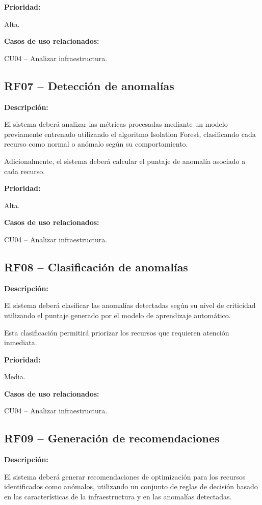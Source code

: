 \noindent \textbf{Prioridad:}

Alta.

\noindent \textbf{Casos de uso relacionados:}

\noindent CU04 -- Analizar infraestructura.

\subsection{RF07 -- Detección de anomalías}

\noindent \textbf{Descripción:}

El sistema deberá analizar las métricas procesadas mediante un modelo previamente entrenado utilizando el algoritmo Isolation Forest, clasificando cada recurso como normal o anómalo según su comportamiento.

Adicionalmente, el sistema deberá calcular el puntaje de anomalía asociado a cada recurso.

\noindent \textbf{Prioridad:}

Alta.

\noindent \textbf{Casos de uso relacionados:}

\noindent CU04 -- Analizar infraestructura.

\subsection{RF08 -- Clasificación de anomalías}

\noindent \textbf{Descripción:}

El sistema deberá clasificar las anomalías detectadas según su nivel de criticidad utilizando el puntaje generado por el modelo de aprendizaje automático.

Esta clasificación permitirá priorizar los recursos que requieren atención inmediata.

\noindent \textbf{Prioridad:}

Media.

\noindent \textbf{Casos de uso relacionados:}

\noindent CU04 -- Analizar infraestructura.

\subsection{RF09 -- Generación de recomendaciones}

\noindent \textbf{Descripción:}

El sistema deberá generar recomendaciones de optimización para los recursos identificados como anómalos, utilizando un conjunto de reglas de decisión basado en las características de la infraestructura y en las anomalías detectadas.

